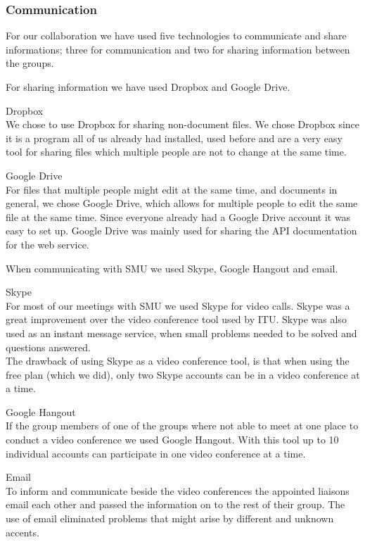 \subsubsection{Communication}
For our collaboration we have used five technologies to communicate and share informations; three for communication and two for sharing information between the groups.

For sharing information we have used Dropbox and Google Drive. \vspace{-4mm}
\begin{description}
	\item Dropbox \\
		We chose to use Dropbox for sharing non-document files. We chose Dropbox since it is a program all of us already had installed, used before and are a very easy tool for sharing files which multiple people are not to change at the same time.
	\item Google Drive \\
		For files that multiple people might edit at the same time, and documents in general, we chose Google Drive, which allows for multiple people to edit the same file at the same time. Since everyone already had a Google Drive account it was easy to set up.
		Google Drive was mainly used for sharing the API documentation for the web service.
\end{description}

When communicating with SMU we used Skype, Google Hangout and email.
\vspace{-4mm}
\begin{description}
	\item Skype \\
		For most of our meetings with SMU we used Skype for video calls. Skype was a great improvement over the video conference tool used by ITU.
		Skype was also used as an instant message service, when small problems needed to be solved and questions answered. \\
		The drawback of using Skype as a video conference tool, is that when using the free plan (which we did), only two Skype accounts can be in a video conference at a time.
	\item Google Hangout \\
		If the group members of one of the groups where not able to meet at one place to conduct a video conference we used Google Hangout. With this tool up to 10 individual accounts can participate in one video conference at a time.
	\item Email \\
		To inform and communicate beside the video conferences the appointed liaisons email each other and passed the information on to the rest of their group.
		The use of email eliminated problems that might arise by different and unknown accents.
\end{description}